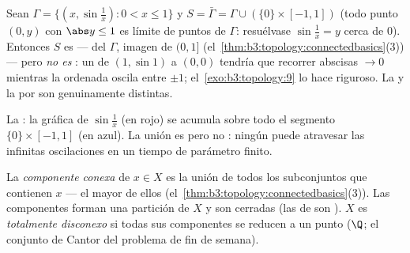 \begin{example}
\label{ex:b3:topology:sinecurve}
Sean $\Gamma = \{(x, \sin\frac1x) : 0 < x \leq 1\}$ y $S =
\bar\Gamma = \Gamma \cup (\{0\}\times[-1,1])$ (todo punto $(0,
y)$ con $\abs y \leq 1$ es límite de puntos de $\Gamma$: resuélvase
$\sin\frac1x = y$ cerca de $0$). Entonces $S$ es
\emph{} ---
 del
 $\Gamma$, imagen
 de $(0, 1]$
(el~\cref{thm:b3:topology:connectedbasics}(3)) --- pero \emph{no es
}: un
 de $(1, \sin 1)$ a
$(0,0)$ tendría que recorrer abscisas $\to 0$ mientras la ordenada
oscila entre $\pm1$; el~\cref{exo:b3:topology:9} lo hace riguroso. La
 y la
 por  son
genuinamente distintas.
\end{example}

\begin{omfigure}

{\small La :
la gráfica de $\sin\frac1x$ (en rojo) se acumula sobre todo el segmento
$\{0\}\times[-1,1]$ (en azul). La unión es
 pero no
: ningún
 puede atravesar las
infinitas oscilaciones en un tiempo de parámetro finito.}
\end{omfigure}

\begin{definition}\label{def:b3:topology:components}
La \emph{componente conexa} de $x
\in X$ es la unión de todos los subconjuntos
 que contienen $x$ --- el
mayor de ellos (el~\cref{thm:b3:topology:connectedbasics}(3)). Las
componentes forman una partición de $X$ y son cerradas (las
 de
 son
). $X$ es \emph{totalmente
disconexo} si todas sus componentes se reducen a un punto ($\Q$; el
conjunto de Cantor del problema de fin de semana).
\end{definition}

